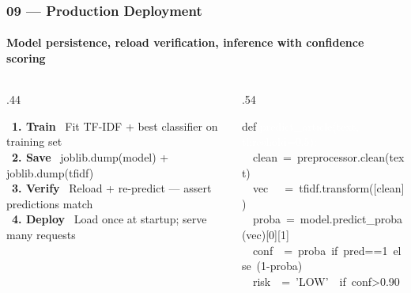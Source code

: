 \documentclass[aspectratio=169,10pt]{beamer}
\begin{document}
\begin{frame}[t]
\frametitle{09 --- Production Deployment}
\framesubtitle{Model persistence, reload verification, inference with confidence scoring}
\vspace{.06cm}
\begin{columns}[T]
\begin{column}{.44\textwidth}
  \begin{tcolorbox}[mycard={BlueMid}{ABlue},title={\footnotesize\textbf{Model Persistence (joblib)}},
      colbacktitle=ABlue,coltitle=white]
    \ \textbf{\textcolor{ABlue}{1. Train}}\ %
    {\scriptsize\color{Slate}Fit TF-IDF + best classifier on training set}\\[4pt]
    \ \textbf{\textcolor{APurple}{2. Save}}\ %
    {\scriptsize\color{Slate}joblib.dump(model) + joblib.dump(tfidf)}\\[4pt]
    \ \textbf{\textcolor{AGreen}{3. Verify}}\ %
    {\scriptsize\color{Slate}Reload + re-predict --- assert predictions match}\\[4pt]
    \ \textbf{\textcolor{AOrange}{4. Deploy}}\ %
    {\scriptsize\color{Slate}Load once at startup; serve many requests}
  \end{tcolorbox}
\end{column}
\begin{column}{.54\textwidth}
  \begin{tcolorbox}[codeblock,title={\textbf{predict\_article() Function}},
      colbacktitle=Navy,coltitle=ABlue,fonttitle=\scriptsize\bfseries]
    \textcolor{ABlue}{def} \textcolor{white}{predict\_article(text, threshold=0.5):}\\
    \ \ \textcolor{CodeGray}{clean}\ =\ preprocessor.clean(text)\\
    \ \ \textcolor{CodeGray}{vec}\ \ \ =\ tfidf.transform([clean])\\
    \ \ \textcolor{CodeGray}{proba}\ =\ model.predict\_proba(vec)[0][1]\\
    \ \ \textcolor{CodeGray}{conf}\ \ =\ proba\ \textcolor{ABlue}{if}\ pred==1\ \textcolor{ABlue}{else}\ (1-proba)\\
    \ \ \textcolor{CodeGray}{risk}\ \ =\ \textcolor{AGreen}{'LOW'}\ \ \textcolor{ABlue}{if}\ conf>0.90\\

\end{tcolorbox}
\end{column}
\end{columns}
\end{frame}
\end{document}
